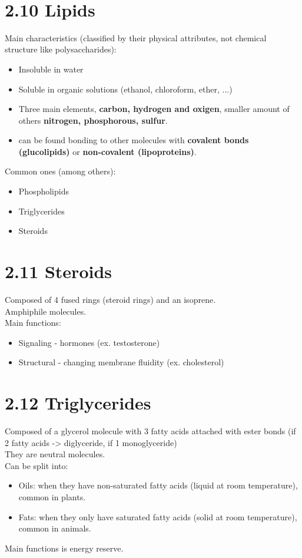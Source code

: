 \documentclass[a4paper,landscape,10pt]{cheatsheet}
\begin{document}
\hfill\\
\section*{2.10 Lipids}
Main characteristics (classified by their physical attributes, not chemical structure like polysaccharides):
\begin{itemize}
      \item Insoluble in water
      \item Soluble in organic solutions (ethanol, chloroform, ether, ...)
      \item Three main elements, \textbf{carbon, hydrogen and oxigen}, smaller amount of others \textbf{nitrogen,
                  phosphorous, sulfur}.
      \item can be found bonding to other molecules with \textbf{covalent bonds (glucolipids)} or \textbf{non-covalent
                  (lipoproteins)}.
\end{itemize}

Common ones (among others):
\begin{itemize}
      \item Phospholipids
      \item Triglycerides
      \item Steroids
\end{itemize}

\section*{2.11 Steroids}
Composed of 4 fused rings (steroid rings) and an isoprene. \\
Amphiphile  molecules.\\
\medskip
Main functions:
\begin{itemize}
      \item Signaling - hormones (ex. testosterone)
      \item Structural - changing membrane fluidity (ex. cholesterol)
\end{itemize}

\section*{2.12 Triglycerides}
Composed of a glycerol molecule with 3 fatty acids attached with ester bonds (if 2 fatty acids -> diglyceride, if 1
monoglyceride)\\
\medskip
They are neutral  molecules.\\
\medskip
Can be split into:
\begin{itemize}
      \item Oils: when they have non-saturated fatty acids (liquid at room temperature), common in plants.
      \item Fats: when they only have saturated fatty acids (solid at room temperature), common in animals.
\end{itemize}
Main functions is energy reserve.
\end{document}
